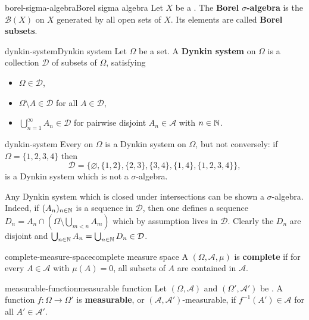\begin{topic}{borel-sigma-algebra}{Borel sigma algebra}
    Let $X$ be a . The \textbf{Borel $\sigma$-algebra} is the  $\mathcal{B}(X)$ on $X$ generated by all open sets of $X$. Its elements are called \textbf{Borel subsets}.
\end{topic}

\begin{topic}{dynkin-system}{Dynkin system}
    Let $\Omega$ be a set. A \textbf{Dynkin system} on $\Omega$ is a collection $\mathcal{D}$ of subsets of $\Omega$, satisfying
    \begin{itemize}
        \item $\Omega \in \mathcal{D}$,
        \item $\Omega \setminus A \in \mathcal{D}$ for all $A \in \mathcal{D}$,
        \item $\bigcup_{n = 1}^\infty A_n \in \mathcal{D}$ for pairwise disjoint $A_n \in \mathcal{A}$ with $n \in \mathbb{N}$.
    \end{itemize}
\end{topic}

\begin{example}{dynkin-system}
    Every  on $\Omega$ is a Dynkin system on $\Omega$, but not conversely: if $\Omega = \{ 1, 2, 3, 4 \}$ then
    \[ \mathcal{D} = \{ \varnothing, \{ 1, 2 \}, \{ 2, 3 \}, \{ 3, 4 \}, \{ 1, 4 \}, \{ 1, 2, 3, 4 \} \} , \]
    is a Dynkin system which is not a $\sigma$-algebra.

    Any Dynkin system which is closed under intersections can be shown a $\sigma$-algebra. Indeed, if $(A_n)_{n \in \mathbb{N}}$ is a sequence in $\mathcal{D}$, then one defines a sequence $D_n = A_n \cap \left(\Omega \setminus \bigcup_{m < n} A_m \right)$ which by assumption lives in $\mathcal{D}$. Clearly the $D_n$ are disjoint and $\bigcup_{n \in \mathbb{N}} A_n = \bigcup_{n \in \mathbb{N}} D_n \in \mathcal{D}$.
\end{example}

\begin{topic}{complete-measure-space}{complete measure space}
    A  $(\Omega, \mathcal{A}, \mu)$ is \textbf{complete} if for every $A \in \mathcal{A}$ with $\mu(A) = 0$, all subsets of $A$ are contained in $\mathcal{A}$.
\end{topic}

\begin{topic}{measurable-function}{measurable function}
    Let $(\Omega, \mathcal{A})$ and $(\Omega', \mathcal{A}')$ be . A function $f \colon \Omega \to \Omega'$ is \textbf{measurable}, or $(\mathcal{A}, \mathcal{A}')$-measurable, if $f^{-1}(A') \in \mathcal{A}$ for all $A' \in \mathcal{A}'$.
\end{topic}

